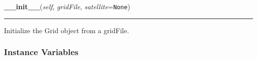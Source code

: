     \label{satstress:GridCalc:Grid:__init__}

    \vspace{0.5ex}

\hspace{.8\funcindent}\begin{boxedminipage}{\funcwidth}

    \raggedright \textbf{\_\_init\_\_}(\textit{self}, \textit{gridFile}, \textit{satellite}={\tt None})

    \vspace{-1.5ex}

    \rule{\textwidth}{0.5\fboxrule}
\setlength{\parskip}{2ex}
    Initialize the Grid object from a gridFile.

\setlength{\parskip}{1ex}
    \end{boxedminipage}



  \subsubsection{Instance Variables}

